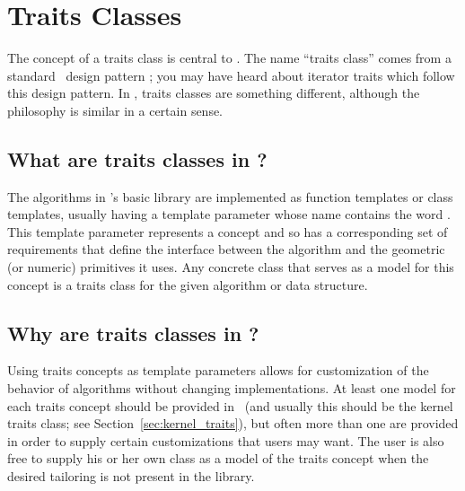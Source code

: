 
\chapter{Traits Classes}
\label{chap:traits_classes}

The concept of a traits class is central to \cgal. The name ``traits
class'' comes from a standard \CC\ design pattern
\cite{cgal:m-tnutt-95}; you may have heard about iterator traits which
follow this design pattern. In \cgal, traits classes are something
different, although the philosophy is similar in a certain sense.

\section{What are traits classes in \cgal?} 
\label{sec:what_is_a_traits_class}

The algorithms in \cgal's basic library are implemented as function templates
or class templates, usually having a template parameter whose name contains
the word .  This template parameter 
represents a concept and so has a corresponding set of requirements that
define the interface between the algorithm and the geometric (or numeric) 
primitives it uses.  Any concrete class that serves as a model for this 
concept is a traits class for the given algorithm or data structure.

\section{Why are traits classes in \cgal?}
\label{sec:why_traits_classes}

Using traits concepts as template parameters allows for customization of 
the behavior of algorithms without changing implementations.
At least one model for each traits concept should be provided in
\cgal\ (and usually this should be the kernel traits class; see 
Section~\ref{sec:kernel_traits}), but often more than one are provided
in order to supply certain customizations that users may want.  The user 
is also free to supply his or her own class as a model of the traits
concept when the desired tailoring is not present in the library.

